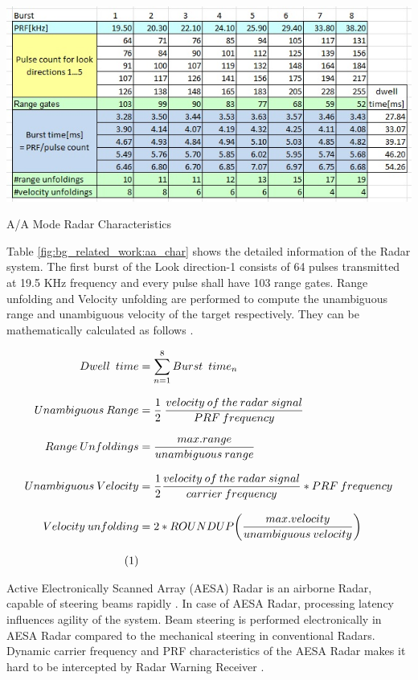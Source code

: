 \begin{table}
	\centering
	\includegraphics[width=140mm]{figures/aa_char}
	\caption{A/A Mode Radar Characteristics}
	\label{fig:bg_related_work:aa_char}
\end{table}

Table \ref{fig:bg_related_work:aa_char} shows the detailed information of the Radar system. The first burst of the Look direction-1 consists of 64 pulses transmitted at 19.5 KHz frequency and every pulse shall have 103 range gates. Range unfolding and Velocity unfolding are performed to compute the unambiguous range and unambiguous velocity of the target respectively. They can be mathematically calculated as follows \cite{unambiVelo}. 

\begin{align*}
	\label{equ:burst_time_calc}
	Dwell \enspace time &= \sum\limits_{n=1}^{8} Burst \enspace time_{n} \\[0.3cm]
	Unambiguous \: Range &= \frac{1}{2} \: \frac{velocity \: of \: the \: radar \: signal}{PRF \: frequency} \\[0.3cm]
	Range \: Unfoldings &= \frac{max.range}{unambiguous \: range} \\[0.3cm]
	Unambiguous \: Velocity &= \frac{1}{2} \frac{velocity \: of \: the \: radar \: signal}{carrier \: frequency} * PRF \: frequency \\[0.3cm]
	Velocity \: unfolding &= 2 * ROUNDUP \bigg( \frac{max.velocity}{unambiguous \: velocity} \bigg ) \\[0.3cm] \stepcounter{equation}\tag{\theequation} 
\end{align*}

Active Electronically Scanned Array (AESA) Radar is an airborne Radar, capable of steering beams rapidly \cite{aesaAbt}. In case of AESA Radar, processing latency influences agility of the system. Beam steering is performed electronically in AESA Radar compared to the mechanical steering in conventional Radars. Dynamic carrier frequency and PRF characteristics of the AESA Radar makes it hard to be intercepted by Radar Warning Receiver \cite{aesaIntercept}.

